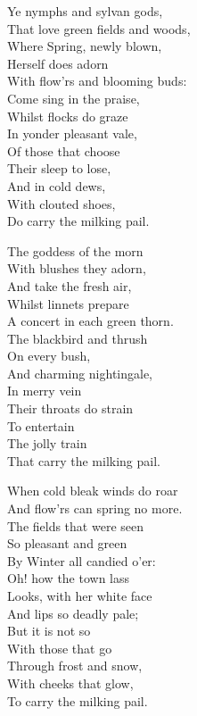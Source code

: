 \settowidth{\versewidth}{That love green fields and woods,}
\begin{dcverse}\begin{patverse}
Ye nymphs and sylvan gods,\\
That love green fields and woods,\\
Where Spring, newly blown,\\
Herself does adorn\\
With flow’rs and blooming buds:\\
Come sing in the praise,\\
Whilst flocks do graze\\
In yonder pleasant vale,\\
Of those that choose\\
Their sleep to lose,\\
And in cold dews,\\
With clouted shoes,\\
Do carry the milking pail.
\end{patverse}

\begin{patverse}
The goddess of the morn\\
With blushes they adorn,\\
And take the fresh air,\\
Whilst linnets prepare\\
A concert in each green thorn.\\
The blackbird and thrush\\
On every bush,\\
And charming nightingale,\\
In merry vein\\
Their throats do strain\\
To entertain\\
The jolly train\\
That carry the milking pail.
\end{patverse}

\begin{patverse}
When cold bleak winds do roar\\
And flow’rs can spring no more.\\
The fields that were seen\\
So pleasant and green\\
By Winter all candied o’er:\\
Oh! how the town lass\\
Looks, with her white face\\
And lips so deadly pale;\\
But it is not so\\
With those that go\\
Through frost and snow,\\
With cheeks that glow,\\
To carry the milking pail.
\end{patverse}


\end{dcverse}
